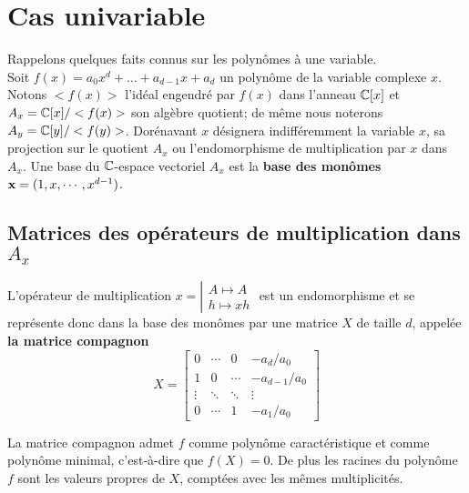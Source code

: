 \documentclass{standalone}
\begin{document}
  \section{Cas univariable}
  \label{univariable}

  Rappelons quelques faits connus sur les polynômes à une variable.\\
  Soit $f(x) = a_0x^d + \dots + a_{d-1}x + a_d$ un polynôme de la variable complexe $x$. Notons $<f(x)>$ l'idéal engendré par $f(x)$ dans l'anneau $\mathbb{C}[x]$ et $A_x = \mathbb{C}[x]/<f(x)>$  son algèbre quotient; de même nous noterons $A_y = \mathbb{C}[y]/<f(y)>$. Dorénavant $x$ désignera indifféremment la variable $x$, sa projection sur le quotient $A_x$ ou l'endomorphisme de multiplication par $x$ dans $A_x$. Une base du $\mathbb{C}$-espace vectoriel $A_x$ est la {\bf base des monômes} $\bold{x} = (1, x,\cdots, x^{d-1})$.

  \subsection{Matrices des opérateurs de multiplication dans $A_x$}
  L'opérateur de multiplication
  $x = \left\vert
  \begin{array}{c}
  A \mapsto A \\
  h \mapsto xh
  \end{array}
  \right.$ est un endomorphisme et se représente donc dans la base des monômes par
  une matrice $X$ de taille $d$, appelée {\bf la matrice compagnon}
  \begin{equation}
  \label{compan}
  X =
  \begin{bmatrix}
  	0 & \cdots & 0 & -a_d/a_0 \\
  	1 & 0 & \cdots & -a_{d-1}/a_0 \\
  	\vdots  & \ddots  & \ddots & \vdots  \\
  	0 & \cdots & 1 & -a_1/a_0
  \end{bmatrix}
  \end{equation}

  \begin{prop}
  \label{compan2roots}
  La matrice compagnon admet $f$ comme polynôme caractéristique et comme polynôme minimal, c'est-à-dire que $f(X) = 0$. De plus les racines du polynôme $f$ sont les valeurs propres de $X$, comptées avec les mêmes multiplicités.
  \end{prop}
\end{document}
